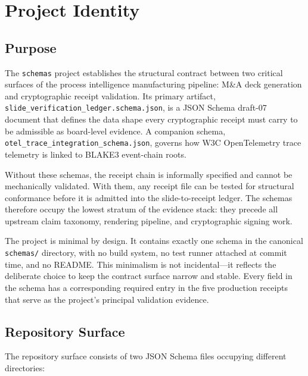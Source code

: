 
\section{Project Identity}
\label{sec:schemas-identity}

\subsection{Purpose}
\label{sec:schemas-identity-purpose}

The \texttt{schemas} project establishes the structural contract between two critical surfaces of the
process intelligence manufacturing pipeline: M\&A deck generation and cryptographic receipt
validation. Its primary artifact, \texttt{slide\_verification\_ledger.schema.json}, is a JSON Schema
draft-07 document that defines the data shape every cryptographic receipt must carry to be
admissible as board-level evidence. A companion schema, \texttt{otel\_trace\_integration\_schema.json},
governs how W3C OpenTelemetry trace telemetry is linked to BLAKE3 event-chain roots.

Without these schemas, the receipt chain is informally specified and cannot be mechanically
validated. With them, any receipt file can be tested for structural conformance before it is
admitted into the slide-to-receipt ledger. The schemas therefore occupy the lowest stratum of
the evidence stack: they precede all upstream claim taxonomy, rendering pipeline, and
cryptographic signing work.

The project is minimal by design. It contains exactly one schema in the canonical \texttt{schemas/}
directory, with no build system, no test runner attached at commit time, and no README. This
minimalism is not incidental---it reflects the deliberate choice to keep the contract surface
narrow and stable. Every field in the schema has a corresponding required entry in the five
production receipts that serve as the project's principal validation evidence.

\subsection{Repository Surface}
\label{sec:schemas-identity-surface}

The repository surface consists of two JSON Schema files occupying different directories:

